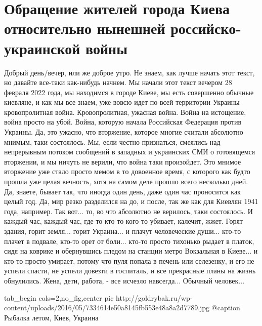  
 
 
 
 

\section{Обращение жителей города Киева относительно нынешней российско-украинской войны}

Добрый день/вечер, или же доброе утро. Не знаем, как лучше начать этот текст,
но давайте все-таки как-нибудь начнем. Мы начали этот текст вечером 28 февраля
2022 года, мы находимся в городе Киеве, мы есть совершенно обычные киевляне, и
как мы все знаем, уже вовсю идет по всей территории Украины кровопролитная
война. Кровопролитная, ужасная война.  Война на истощение, война просто на
убой. Война, которую начала Российская Федерация против Украины. Да, это
ужасно, что вторжение, которое многие считали абсолютно мнимым, таки
состоялось. Мы, если честно признаться, смеялись над непрерывным потоком
сообщений в западных и украинских СМИ о готовящемся вторжении, и мы ничуть не
верили, что война таки произойдет. Это мнимое вторжение уже стало просто мемом
в то довоенное время, с которого как будто прошла уже целая вечность, хотя на
самом деле прошло всего несколько дней. Да, знаете, бывает так, что иногда один
день, даже один час проносится как целый год. Да, мир резко разделился на до, и
после, так же как для Киевлян 1941 года, например. Так вот... то, во что
абсолютно не верилось, таки состоялось. И каждый час, каждый час, где-то кто-то
кого-то убивает, калечит, жжет. Горят здания, горит земля... горит Украина...
и плачут человеческие души...  кто-то плачет в подвале, кто-то орет от боли...
кто-то просто тихонько рыдает в платок, сидя на коврике и обернувшись пледом на
станции метро Вокзальная в Киеве... и кто-то просто умирает, потому что пуля
попала в печень или селезенку, и его не успели спасти, не успели довезти в
госпиталь, и все прекрасные планы на жизнь обнулились.  Жена, дети, работа, -
все исчезло навсегда... Обычный человек...

\ifcmt
  tab_begin cols=2,no_fig,center
		 pic http://goldrybak.ru/wp-content/uploads/2016/05/7334614e50a8145fb553e48a8a2d7789.jpg
		 @caption Рыбалка летом, Киев, Украина

